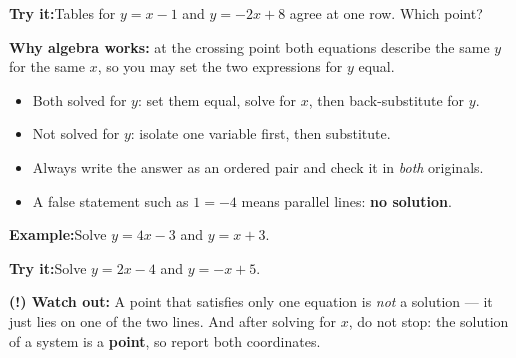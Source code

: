 \documentclass[12pt]{article}
\begin{document}
\begin{tryitbox}
\textbf{Try it:}\quad Tables for $y = x - 1$ and $y = -2x + 8$ agree at one row. Which point?\\[2pt]
\end{tryitbox}


\begin{formulabox}
\textbf{Why algebra works:} at the crossing point both equations describe the same
$y$ for the same $x$, so you may set the two expressions for $y$ equal.
\begin{itemize}[leftmargin=0.8cm, itemsep=0pt, topsep=2pt]
  \item Both solved for $y$: set them equal, solve for $x$, then back-substitute for $y$.
  \item Not solved for $y$: isolate one variable first, then substitute.
  \item Always write the answer as an ordered pair and check it in \emph{both} originals.
  \item A false statement such as $1 = -4$ means parallel lines: \textbf{no solution}.
\end{itemize}
\end{formulabox}

\begin{examplebox}
\textbf{Example:}\quad Solve $y = 4x - 3$ and $y = x + 3$.
\end{examplebox}

\begin{tryitbox}
\textbf{Try it:}\quad Solve $y = 2x - 4$ and $y = -x + 5$.\\[2pt]
\end{tryitbox}

\begin{watchoutbox}
\textbf{(!) Watch out:} A point that satisfies only one equation is \emph{not} a
solution --- it just lies on one of the two lines. And after solving for $x$, do not
stop: the solution of a system is a \textbf{point}, so report both coordinates.
\end{watchoutbox}
\end{document}
